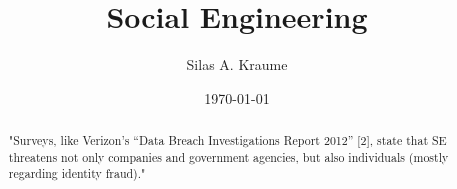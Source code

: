 \documentclass{report}
\begin{document}
\title{\Huge{Social Engineering}}
\author{Silas A. Kraume}
\date{\today}

\maketitle

\tableofcontents

\begin{abstract}
    "Surveys, like Verizon's “Data Breach Investigations Report 2012” [2], state that SE threatens not only companies and government agencies, but also individuals (mostly regarding identity fraud)."\cite{7_mdpi}
\end{abstract}







{}


\end{document}
